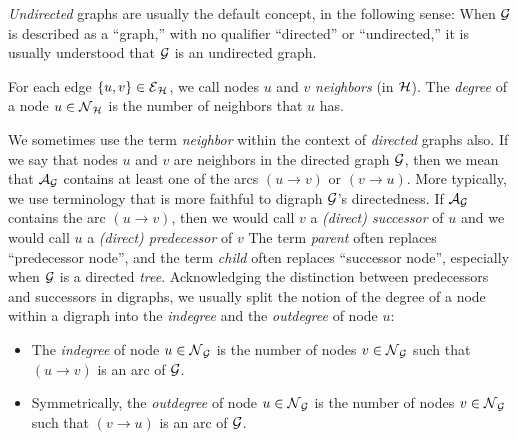 \medskip

{\em Undirected} graphs are usually the default concept, in the
following sense: When $\mbox{$\cal G$}$ is described as a ``graph,'' with no
qualifier ``directed'' or ``undirected,'' it is usually understood
that $\mbox{$\cal G$}$ is an undirected graph.

\medskip

For each edge $\{u,v\} \in \mbox{$\cal E$}_{\mbox{{\scriptsize $\cal H$}}}$, we call nodes $u$ and $v$ {\it
  neighbors} (in $\mbox{$\cal H$}$).
The {\it degree}
of a node $u \in \mbox{$\cal N$}_{\mbox{{\scriptsize $\cal H$}}}$ is the number of neighbors that $u$ has.

We sometimes use the term {\it neighbor} within the context of {\em
  directed} graphs also.  If we say that nodes $u$ and $v$ are
neighbors in the directed graph $\mbox{$\cal G$}$,
then we mean that $\mbox{$\cal A$}_{\mbox{{\scriptsize $\cal G$}}}$ contains at least one of the arcs $(u
  \rightarrow v)$ or $(v \rightarrow u)$.  More typically, we use
  terminology that is more faithful to digraph $\mbox{$\cal G$}$'s directedness.
If $\mbox{$\cal A$}_{\mbox{{\scriptsize $\cal G$}}}$ contains the arc $(u \rightarrow v)$, then we would call
  $v$ a {\it (direct) successor} of $u$
and we would call $u$ a {\it (direct) predecessor} of $v$
The term {\it parent} often replaces ``predecessor node'', and the
term {\it child} often replaces ``successor node'', especially when
$\mbox{$\cal G$}$ is a directed {\em tree}.  Acknowledging the distinction between
predecessors and successors in digraphs, we usually split the notion
of the degree of a node within a digraph into the {\it indegree} and
the {\it outdegree} of node $u$:
\begin{itemize}
\item
The {\it indegree} of node $u \in \mbox{$\cal N$}_{\mbox{{\scriptsize $\cal G$}}}$
is the number of nodes $v \in \mbox{$\cal N$}_{\mbox{{\scriptsize $\cal G$}}}$ such that $(u \rightarrow v)$
is an arc of $\mbox{$\cal G$}$.
\item
Symmetrically, the {\it outdegree} of node $u \in \mbox{$\cal N$}_{\mbox{{\scriptsize $\cal G$}}}$
is the number of nodes $v \in \mbox{$\cal N$}_{\mbox{{\scriptsize $\cal G$}}}$ such that $(v \rightarrow u)$
is an arc of $\mbox{$\cal G$}$.
\end{itemize}

